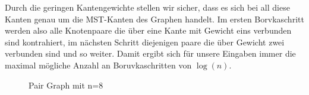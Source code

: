 Durch die geringen Kantengewichte stellen wir sicher, dass es sich bei all diese Kanten genau um die MST-Kanten des Graphen handelt. Im ersten Borvkaschritt werden also alle Knotenpaare die über eine Kante mit Gewicht eins verbunden sind kontrahiert, im nächsten Schritt diejenigen paare die über Gewicht zwei verbunden sind und so weiter. Damit ergibt sich für unsere Eingaben immer die maximal mögliche Anzahl an Boruvkaschritten von $\log(n)$.

\begin{figure}[H]
    \centering
    
    \caption{Pair Graph mit n=8}
    \label{Pair-Graph-Img}
\end{figure}


